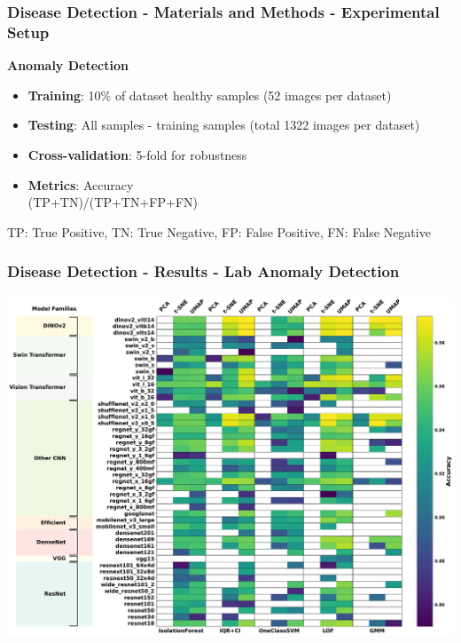 \documentclass[aspectratio=43]{beamer}
\begin{document}
\begin{frame}
    \frametitle{\small Disease Detection - Materials and Methods - Experimental Setup}
    \textbf{Anomaly Detection}
    \begin{itemize}
        \item \textbf{Training}: 10\% of dataset healthy samples (52 images per dataset)
        \item \textbf{Testing}: All samples - training samples (total 1322 images per dataset)
        \item \textbf{Cross-validation}: 5-fold for robustness
        \item \textbf{Metrics}: Accuracy\\ (TP+TN)/(TP+TN+FP+FN)
    \end{itemize}
    \tiny TP: True Positive, TN: True Negative, FP: False Positive, FN: False Negative
\end{frame}

\begin{frame}
    \frametitle{\small Disease Detection - Results - Lab Anomaly Detection}
        \centering
        \includegraphics[width=0.9\linewidth]{Imgs/Plant_Village_Dataset_Anomaly_Detection_Performance.pdf}
\end{frame}
\end{document}
